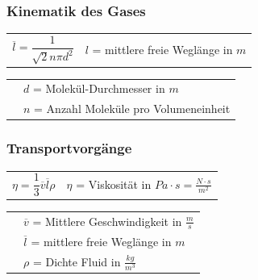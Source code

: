 		\subsubsection{Kinematik des Gases}
		\begin{minipage}[t]{13cm}
			\newline
			\renewcommand{\arraystretch}{2.5}
			\begin{tabular}{ p{3cm} | p{9cm}}
				$\overline{l} = \dfrac{1}{\sqrt{2}n\pi d^2}$	&	$l$ = mittlere freie Weglänge in $m$\\
			\end{tabular}
			\renewcommand{\arraystretch}{1.5}
			\begin{tabular}{ p{3cm} | p{9cm} }
				& $d$ = Molekül-Durchmesser in $m$\\
				& $n$ = Anzahl Moleküle pro Volumeneinheit\\
			\end{tabular} 
			\renewcommand{\arraystretch}{1}
		\end{minipage}
	
		\subsubsection{Transportvorgänge}
			\begin{minipage}{12cm}
					\newline
					\renewcommand{\arraystretch}{2.5}
					\begin{tabular}{ p{4cm} | p{7cm}}
						$\eta = \dfrac{1}{3} \overline{v} \overline{l} \rho$	&	$\eta$ = Viskosität in $Pa \cdot s = \frac{N \cdot s}{m^2}$\\
					\end{tabular}
					\renewcommand{\arraystretch}{1.5}
					\begin{tabular}{ p{4cm} | p{10cm} }
						& $\overline{v}$ = Mittlere Geschwindigkeit in $\frac{m}{s}$\\
						& $\overline{l}$ = mittlere freie Weglänge in $m$\\
						& $\rho$ = Dichte Fluid in $\frac{kg}{m^3}$\\
					\end{tabular} 
					\renewcommand{\arraystretch}{1}
			\end{minipage}
	\newpage
